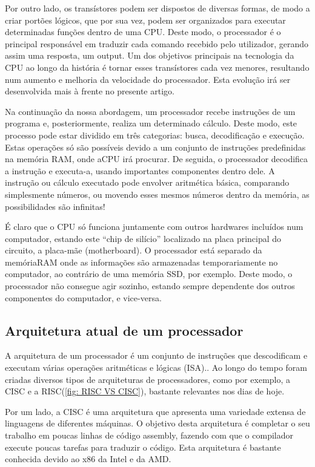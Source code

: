\documentclass{report}
\begin{document}
 Por outro lado, os transístores podem ser dispostos de diversas formas, de modo a criar portões lógicos, que por sua vez, podem ser organizados para executar determinadas funções dentro de uma \ac{CPU}. Deste modo, o processador é o principal responsável em traduzir cada comando recebido pelo utilizador, gerando assim uma resposta, um output. Um dos objetivos principais na tecnologia da \ac{CPU} ao longo da história é tornar esses transístores cada vez menores, resultando num aumento e melhoria da velocidade do processador. Esta evolução irá ser desenvolvida mais à frente no presente artigo\cite{Funcionamento2}.
 
Na continuação da nossa abordagem, um processador recebe instruções de um programa e, posteriormente, realiza um determinado cálculo. Deste modo, este processo pode estar dividido em três categorias: busca, decodificação e execução. Estas operações só são possíveis devido a um conjunto de instruções predefinidas na memória \ac{RAM}, onde a\ac{CPU} irá procurar. De seguida, o processador decodifica a instrução e executa-a, usando importantes componentes dentro dele. A instrução ou cálculo executado pode envolver aritmética básica, comparando simplesmente números, ou movendo esses mesmos números dentro da memória, as possibilidades são infinitas\cite{Funcionamento3}!

É claro que o \ac{CPU} só funciona juntamente com outros hardwares incluídos num computador, estando este “chip de silício” localizado na placa principal do circuito, a placa-mãe (motherboard). O processador está separado da memória\ac{RAM} onde as informações são armazenadas temporariamente no computador, ao contrário de uma memória \ac{SSD}, por exemplo. Deste modo, o processador não consegue agir sozinho, estando sempre dependente dos outros componentes do computador, e vice-versa\cite{Funcionamento2}. 


\subsection{Arquitetura atual de um processador}

A arquitetura de um processador é um conjunto de instruções que descodificam e executam várias operações aritméticas e lógicas (\ac{ISA}).\cite{Arquitetura2}. Ao longo do tempo foram criadas diversos tipos de arquiteturas de processadores, como por exemplo, a \ac{CISC} e a \ac{RISC}(\ref{fig: RISC VS CISC}), bastante relevantes nos dias de hoje. 

Por um lado, a \ac{CISC}  é uma arquitetura que apresenta uma variedade extensa de linguagens de diferentes máquinas. O objetivo desta arquitetura é completar o seu trabalho em poucas linhas de código assembly, fazendo com que o compilador execute poucas tarefas para traduzir o código. Esta arquitetura é bastante conhecida devido ao x86 da \ac{Intel} e da \ac{AMD}\cite{Arquitetura2}.
\end{document}
